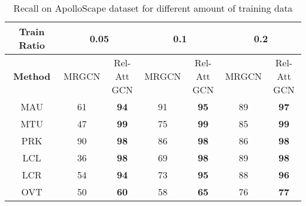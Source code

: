 \documentclass[letterpaper, 10 pt, conference]{ieeeconf}
\begin{document}
\begin{table}[h]
\renewcommand{\arraystretch}{1.3}
    \centering
\begin{adjustbox}{max width=\linewidth}
    \begin{tabular}{|c|c|c||c|c||c|c|}
    \hline
    \textbf{Train Ratio} & \multicolumn{2}{|c||}{0.05} & \multicolumn{2}{|c||}{0.1} & \multicolumn{2}{|c|}{0.2}  \\
    \hline
    \textbf{Method} & MRGCN & \shortstack{Rel-Att\\GCN} & MRGCN & \shortstack{Rel-Att\\GCN} & MRGCN & \shortstack{Rel-Att\\GCN} \\
    \hline
    MAU & 61 & \textbf{94} & 91 & \textbf{95} & 89 & \textbf{97} \\
    MTU & 47 & \textbf{99} & 75 & \textbf{99} & 85 & \textbf{99} \\
    PRK & 90 & \textbf{98} & 86 & \textbf{98} & 86 & \textbf{98} \\
    LCL & 36 & \textbf{98} & 69 & \textbf{98} & 89 & \textbf{98} \\
    LCR & 54 & \textbf{94} & 73 & \textbf{95} & 88 & \textbf{96} \\
    OVT & 50 & \textbf{60} & 58 & \textbf{65} & 76 & \textbf{77} \\
    \hline
    \end{tabular}
     \end{adjustbox}
     \caption{\scriptsize {Recall on ApolloScape dataset for different amount of training data}}
\vspace{-5mm}
    \label{table:ablation}
\end{table}
\end{document}
